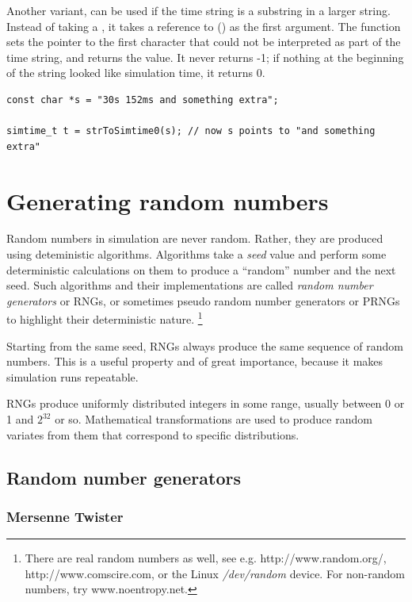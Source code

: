 Another variant,  can be used if the time
string is a substring in a larger string. Instead of taking a ,
it takes a reference to  () as the first argument.  The
function sets the pointer to the first character that could not be
interpreted as part of the time string, and returns the value. It
never returns -1; if nothing at the beginning of the string looked
like simulation time, it returns 0.

\begin{verbatim}
const char *s = "30s 152ms and something extra";

simtime_t t = strToSimtime0(s); // now s points to "and something extra"
\end{verbatim}


\section{Generating random numbers}
\label{cha:sim-lib:generating-random-numbers}

Random numbers in simulation are never random. Rather, they are
produced using deteministic algorithms. Algorithms take a \textit{seed} value
and perform some deterministic calculations on them to produce
a ``random'' number and the next seed. Such algorithms and their
implementations are called \textit{random number generators} or RNGs,
or sometimes pseudo random number generators or PRNGs to highlight
their deterministic nature.
  \footnote{There are real random numbers as well, see e.g.
  http://www.random.org/, http://www.comscire.com, or the Linux
  \textit{/dev/random} device. For non-random numbers, try www.noentropy.net.}

Starting from the same seed, RNGs always produce the same sequence
of random numbers. This is a useful property and of great importance,
because it makes simulation runs repeatable.

RNGs produce uniformly distributed integers in some range,
usually between 0 or 1 and $2^{32}$ or so. Mathematical transformations
are used to produce random variates from them that correspond to
specific distributions.

\subsection{Random number generators}
\label{sec:sim-lib:rngs}

\subsubsection{Mersenne Twister}

